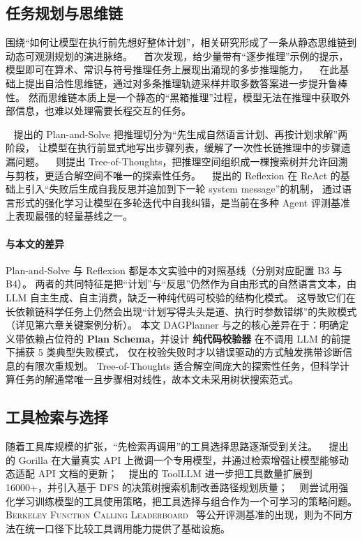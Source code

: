 \subsection{任务规划与思维链}

围绕“如何让模型在执行前先想好整体计划”，相关研究形成了一条从静态思维链到动态可观测规划的演进脉络。
\citeauthor{wei2022cot}~\cite{wei2022cot} 首次发现，给少量带有“逐步推理”示例的提示，模型即可在算术、常识与符号推理任务上展现出涌现的多步推理能力，
\citeauthor{wang2023selfconsistency}~\cite{wang2023selfconsistency} 在此基础上提出自洽性思维链，通过对多条推理轨迹采样并取多数答案进一步提升鲁棒性。
然而思维链本质上是一个静态的“黑箱推理”过程，模型无法在推理中获取外部信息，也难以处理需要长程交互的任务。

\citeauthor{wang2023plansolve}~\cite{wang2023plansolve} 提出的 Plan-and-Solve 把推理切分为“先生成自然语言计划、再按计划求解”两阶段，
让模型在执行前显式地写出步骤列表，缓解了一次性长链推理中的步骤遗漏问题。
\citeauthor{yao2023tot}~\cite{yao2023tot} 则提出 Tree-of-Thoughts，把推理空间组织成一棵搜索树并允许回溯与剪枝，更适合解空间不唯一的探索性任务。
\citeauthor{shinn2023reflexion}~\cite{shinn2023reflexion} 提出的 Reflexion 在 ReAct 的基础上引入“失败后生成自我反思并追加到下一轮 system message”的机制，
通过语言形式的强化学习让模型在多轮迭代中自我纠错，是当前在多种 Agent 评测基准上表现最强的轻量基线之一。

\paragraph{与本文的差异}
Plan-and-Solve 与 Reflexion 都是本文实验中的对照基线（分别对应配置 B3 与 B4）。
两者的共同特征是把“计划”与“反思”仍然作为自由形式的自然语言文本，由 LLM 自主生成、自主消费，缺乏一种纯代码可校验的结构化模式。
这导致它们在长依赖链科学任务上仍然会出现“计划写得头头是道、执行时参数错绑”的失败模式（详见第六章关键案例分析）。
本文 DAGPlanner 与之的核心差异在于：明确定义带依赖占位符的 \textbf{Plan Schema}，并设计 \textbf{纯代码校验器} 在不调用 LLM 的前提下捕获 5 类典型失败模式，
仅在校验失败时才以错误驱动的方式触发携带诊断信息的有限次重规划。
Tree-of-Thoughts 适合解空间庞大的探索性任务，但科学计算任务的解通常唯一且步骤相对线性，故本文未采用树状搜索范式。

\subsection{工具检索与选择}

随着工具库规模的扩张，“先检索再调用”的工具选择思路逐渐受到关注。
\citeauthor{patil2023gorilla}~\cite{patil2023gorilla} 提出的 Gorilla 在大量真实 API 上微调一个专用模型，并通过检索增强让模型能够动态适配 API 文档的更新；
\citeauthor{qin2024toolllm}~\cite{qin2024toolllm} 提出的 ToolLLM 进一步把工具数量扩展到 16000+，并引入基于 DFS 的决策树搜索机制改善路径规划质量；
\citeauthor{liu2024retool}~\cite{liu2024retool} 则尝试用强化学习训练模型的工具使用策略，把工具选择与组合作为一个可学习的策略问题。
\textsc{Berkeley Function Calling Leaderboard}~\cite{bfcl2024} 等公开评测基准的出现，则为不同方法在统一口径下比较工具调用能力提供了基础设施。

